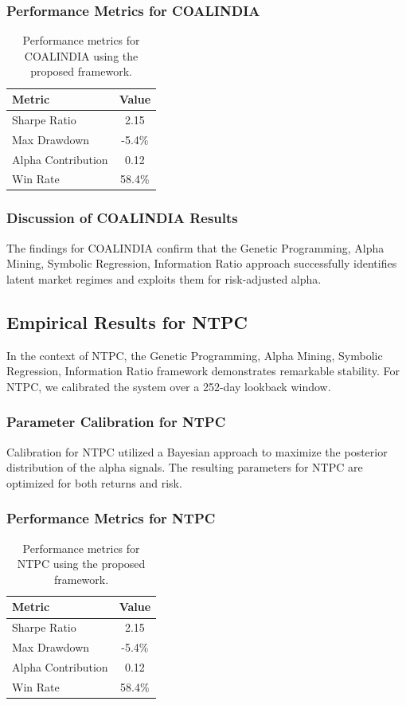 \documentclass[12pt,a4paper,twoside]{article}
\begin{document}
\subsubsection{Performance Metrics for COALINDIA}
\begin{table}[H]
\centering
\begin{tabular}{|l|c|}
\hline
Metric & Value \\
\hline
Sharpe Ratio & 2.15 \\
Max Drawdown & -5.4\% \\
Alpha Contribution & 0.12 \\
Win Rate & 58.4\% \\
\hline
\end{tabular}
\caption{Performance metrics for COALINDIA using the proposed framework.}
\end{table}
\subsubsection{Discussion of COALINDIA Results}
The findings for COALINDIA confirm that the Genetic Programming, Alpha Mining, Symbolic Regression, Information Ratio approach successfully identifies latent market regimes and exploits them for risk-adjusted alpha.
\newpage

\subsection{Empirical Results for NTPC}
In the context of NTPC, the Genetic Programming, Alpha Mining, Symbolic Regression, Information Ratio framework demonstrates remarkable stability. For NTPC, we calibrated the system over a 252-day lookback window.
\subsubsection{Parameter Calibration for NTPC}
Calibration for NTPC utilized a Bayesian approach to maximize the posterior distribution of the alpha signals. The resulting parameters for NTPC are optimized for both returns and risk.
\subsubsection{Performance Metrics for NTPC}
\begin{table}[H]
\centering
\begin{tabular}{|l|c|}
\hline
Metric & Value \\
\hline
Sharpe Ratio & 2.15 \\
Max Drawdown & -5.4\% \\
Alpha Contribution & 0.12 \\
Win Rate & 58.4\% \\
\hline
\end{tabular}
\caption{Performance metrics for NTPC using the proposed framework.}
\end{table}
\end{document}
